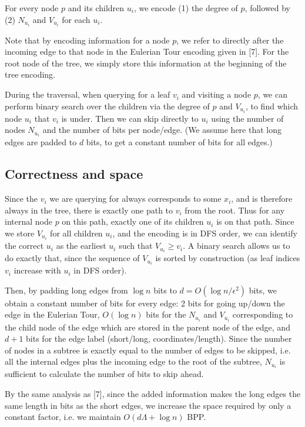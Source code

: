 \documentclass{article}
\begin{document}
For every node $p$ and its children $u_i$, we encode (1) the degree of $p$,
followed by (2) $N_{u_i}$ and $V_{u_i}$ for each $u_i$.

Note that by encoding information for a node $p$, we refer to directly after the
incoming edge to that node in the Eulerian Tour encoding given in [7]. For the
root node of the tree, we simply store this information at the beginning of the
tree encoding.

During the traversal, when querying for a leaf $v_i$ and visiting a node $p$, we
can perform binary search over the children via the degree of $p$ and $V_{u_i}$,
to find which node $u_i$ that $v_i$ is under. Then we can skip directly to $u_i$
using the number of nodes $N_{u_i}$ and the number of bits per node/edge. (We
assume here that long edges are padded to $d$ bits, to get a constant number of
bits for all edges.)

\subsection{Correctness and space}

Since the $v_i$ we are querying for always corresponds to some $x_i$, and is
therefore always in the tree, there is exactly one path to $v_i$ from the root.
Thus for any internal node $p$ on this path, exactly one of its children $u_i$
is on that path. Since we store $V_{u_i}$ for all children $u_i$, and the
encoding is in DFS order, we can identify the correct $u_i$ as the earliest
$u_i$ such that $V_{u_i} \geq v_i$. A binary search allows us to do exactly that,
since the sequence of $V_{u_i}$ is sorted by construction (as leaf indices $v_i$
increase with $u_i$ in DFS order).

Then, by padding long edges from $\log n$ bits to $d = O(\log n / \epsilon^2)$ bits, we
obtain a constant number of bits for every edge: 2 bits for going up/down the
edge in the Eulerian Tour, $O(\log n)$ bits for the $N_{u_i}$ and $V_{u_i}$
corresponding to the child node of the edge which are stored in the parent node
of the edge, and $d+1$ bits for the edge label (short/long, coordinates/length).
Since the number of nodes in a subtree is exactly equal to the number of edges
to be skipped, i.e. all the internal edges plus the incoming edge to the root of
the subtree, $N_{u_i}$ is sufficient to calculate the number of bits to skip
ahead.

By the same analysis as [7], since the added information makes the long edges
the same length in bits as the short edges, we increase the space required by
only a constant factor, i.e. we maintain $O(d\Lambda + \log n)$ BPP.
\end{document}
